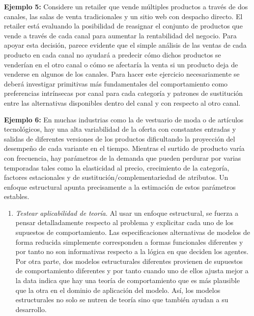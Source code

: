 \documentclass[
]{book}
\providecommand{\tightlist}{%
  \setlength{\itemsep}{0pt}\setlength{\parskip}{0pt}}
\begin{document}
\textbf{Ejemplo 5:} Considere un retailer que vende múltiples productos a través de dos canales, las salas de venta tradicionales y un sitio web con despacho directo. El retailer está evaluando la posibilidad de reasignar el conjunto de productos que vende a través de cada canal para aumentar la rentabilidad del negocio. Para apoyar esta decisión, parece evidente que el simple análisis de las ventas de cada producto en cada canal no ayudará a predecir cómo dichos productos se venderían en el otro canal o cómo se afectaría la venta si un producto deja de venderse en algunos de los canales. Para hacer este ejercicio necesariamente se deberá investigar primitivas más fundamentales del comportamiento como preferencias intrínsecas por canal para cada categoría y patrones de sustitución entre las alternativas disponibles dentro del canal y con respecto al otro canal.

\textbf{Ejemplo 6:} En muchas industrias como la de vestuario de moda o de artículos tecnológicos, hay una alta variabilidad de la oferta con constantes entradas y salidas de diferentes versiones de los productos dificultando la proyección del desempeño de cada variante en el tiempo. Mientras el surtido de producto varía con frecuencia, hay parámetros de la demanda que pueden perdurar por varias temporadas tales como la elasticidad al precio, crecimiento de la categoría, factores estacionales y de sustitución/complementariedad de atributos. Un enfoque estructural apunta precisamente a la estimación de estos parámetros estables.

\begin{enumerate}
\def\labelenumi{\arabic{enumi}.}
\setcounter{enumi}{3}
\tightlist
\item
  \emph{Testear aplicabilidad de teoría}. Al usar un enfoque estructural, se fuerza a pensar detalladamente respecto al problema y explicitar cada uno de los supuestos de comportamiento. Las especificaciones alternativas de modelos de forma reducida simplemente corresponden a formas funcionales diferentes y por tanto no son informativas respecto a la lógica en que deciden los agentes. Por otra parte, dos modelos estructurales diferentes provienen de supuestos de comportamiento diferentes y por tanto cuando uno de ellos ajusta mejor a la data indica que hay una teoría de comportamiento que es más plausible que la otra en el dominio de aplicación del modelo. Así, los modelos estructurales no solo se nutren de teoría sino que también ayudan a su desarrollo.
\end{enumerate}
\end{document}
